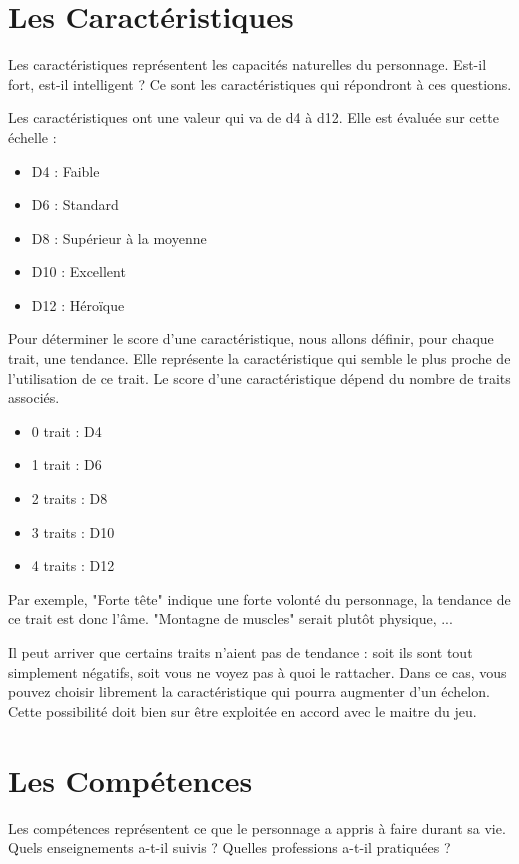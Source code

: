 \documentclass{conf/FusinaClass}
\begin{document}
\chapter{Les Caractéristiques}
Les caractéristiques représentent les capacités naturelles du personnage. Est-il fort, est-il intelligent ? Ce sont les caractéristiques qui répondront à ces questions.

Les caractéristiques ont une valeur qui va de d4 à d12. Elle est évaluée sur cette échelle :

\begin{itemize}
\item D4 : Faible
\item D6 : Standard
\item D8 : Supérieur à la moyenne
\item D10 : Excellent
\item D12 : Héroïque
\end{itemize}

Pour déterminer le score d'une caractéristique, nous allons définir, pour chaque trait, une tendance. Elle représente la caractéristique qui semble le plus proche de l'utilisation de ce trait. Le score d'une caractéristique dépend du nombre de traits associés.

\begin{itemize}
\item 0 trait : D4
\item 1 trait : D6
\item 2 traits : D8
\item 3 traits : D10
\item 4 traits : D12
\end{itemize}

Par exemple, "Forte tête" indique une forte volonté du personnage, la tendance de ce trait est donc l'âme. "Montagne de muscles" serait plutôt physique, ...

Il peut arriver que certains traits n'aient pas de tendance : soit ils sont tout simplement négatifs, soit vous ne voyez pas à quoi le rattacher. Dans ce cas, vous pouvez choisir librement la caractéristique qui pourra augmenter d'un échelon. Cette possibilité doit bien sur être exploitée en accord avec le maitre du jeu.

\chapter{Les Compétences}
Les compétences représentent ce que le personnage a appris à faire durant sa vie. Quels enseignements a-t-il suivis ? Quelles professions a-t-il pratiquées ? 
\end{document}
